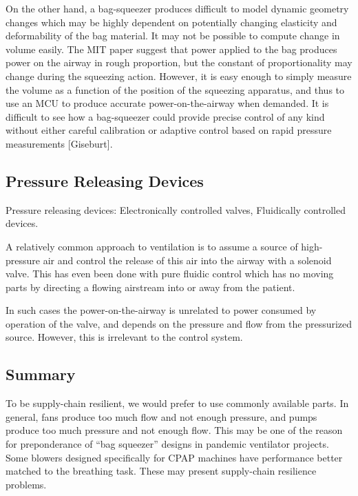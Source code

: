 \documentclass[conference]{article}
\begin{document}
On the other hand, a bag-squeezer produces difficult to model dynamic
geometry changes which may be highly dependent on potentially
changing elasticity and deformability of the bag material.
It may not be possible to compute change in volume easily.
The MIT paper suggest that power applied to the bag produces
power on the airway in rough proportion, but the constant of proportionality
may change during the squeezing action.
However, it is easy enough to simply measure the volume as a function of
the position of the squeezing apparatus, and thus to use
an MCU to produce accurate power-on-the-airway when demanded.
It is difficult to see how a bag-squeezer could provide precise control
of any kind without either careful calibration
or adaptive control based on rapid pressure measurements [Giseburt].

\subsection{Pressure Releasing Devices}

\begin{outline}
  \1 Pressure releasing devices:
  \2 Electronically controlled valves,
  \2 Fluidically controlled devices.
\end{outline}

A relatively common approach to ventilation is to assume a source of high-pressure air and control the release of this air
into the airway with a solenoid valve. This has even been done with pure fluidic control which has no moving parts
by directing a flowing airstream into or away from the patient.

In such cases the power-on-the-airway is unrelated to power consumed by operation of the valve, and
depends on the pressure and flow from the pressurized source. However, this is irrelevant to the control system.

\subsection{Summary}

To be supply-chain resilient, we would prefer to use commonly available parts.
In general, fans produce too much flow and not enough pressure, and pumps produce too much pressure and not enough flow.
This may be one of the reason for preponderance of ``bag squeezer'' designs in pandemic ventilator projects.
Some blowers designed specifically for CPAP machines have performance better matched to the breathing task.
These may present supply-chain resilience problems.
\end{document}
